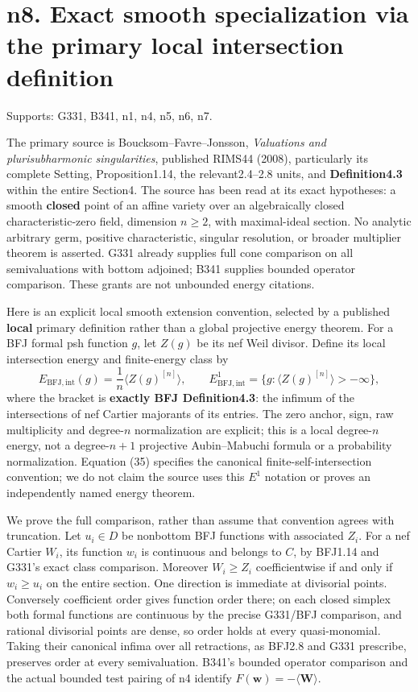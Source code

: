 \documentclass[
  11pt,
]{article}
\begin{document}
\section{n8. Exact smooth specialization via the primary local
intersection
definition}\label{n8.-exact-smooth-specialization-via-the-primary-local-intersection-definition}

Supports: G331, B341, n1, n4, n5, n6, n7.

The primary source is Boucksom--Favre--Jonsson, \emph{Valuations and
plurisubharmonic singularities}, published RIMS44 (2008), particularly
its complete Setting, Proposition1.14, the relevant2.4--2.8 units, and
\textbf{Definition4.3} within the entire Section4. The source has been
read at its exact hypotheses: a smooth \textbf{closed} point of an
affine variety over an algebraically closed characteristic-zero field,
dimension \(n\ge2\), with maximal-ideal section. No analytic arbitrary
germ, positive characteristic, singular resolution, or broader
multiplier theorem is asserted. G331 already supplies full cone
comparison on all semivaluations with bottom adjoined; B341 supplies
bounded operator comparison. These grants are not unbounded energy
citations.

Here is an explicit local smooth extension convention, selected by a
published \textbf{local} primary definition rather than a global
projective energy theorem. For a BFJ formal psh function \(g\), let
\(Z(g)\) be its nef Weil divisor. Define its local intersection energy
and finite-energy class by
\[E_{\mathrm{BFJ,int}}(g)=\frac1n\langle Z(g)^{[n]}\rangle,\qquad E^1_{\mathrm{BFJ,int}}=\{g:\langle Z(g)^{[n]}\rangle> -\infty\},\tag{35}\]
where the bracket is \textbf{exactly BFJ Definition4.3}: the infimum of
the intersections of nef Cartier majorants of its entries. The zero
anchor, sign, raw multiplicity and degree-\(n\) normalization are
explicit; this is a local degree-\(n\) energy, not a degree-\(n+1\)
projective Aubin--Mabuchi formula or a probability normalization.
Equation (35) specifies the canonical finite-self-intersection
convention; we do not claim the source uses this \(E^1\) notation or
proves an independently named energy theorem.

We prove the full comparison, rather than assume that convention agrees
with truncation. Let \(u_i\in D\) be nonbottom BFJ functions with
associated \(Z_i\). For a nef Cartier \(W_i\), its function \(w_i\) is
continuous and belongs to \(C\), by BFJ1.14 and G331's exact class
comparison. Moreover \(W_i\ge Z_i\) coefficientwise if and only if
\(w_i\ge u_i\) on the entire section. One direction is immediate at
divisorial points. Conversely coefficient order gives function order
there; on each closed simplex both formal functions are continuous by
the precise G331/BFJ comparison, and rational divisorial points are
dense, so order holds at every quasi-monomial. Taking their canonical
infima over all retractions, as BFJ2.8 and G331 prescribe, preserves
order at every semivaluation. B341's bounded operator comparison and the
actual bounded test pairing of n4 identify
\(F(\boldsymbol w)=-\langle\boldsymbol W\rangle\).
\end{document}
